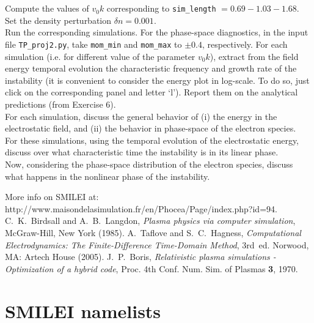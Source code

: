 \documentclass[10pt]{article}
\begin{document}
$ $\\
\\
  Compute the values of $v_0 k$ corresponding to \texttt{sim\_length} $= 0.69 - 1.03 - 1.68$. Set the density perturbation $\delta n = 0.001$. \\
 Run the corresponding simulations. For the phase-space diagnostics, in the input file \texttt{TP\_proj2.py}, take \texttt{mom\_min} and \texttt{mom\_max} to $\pm 0.4$, respectively. For each simulation (i.e. for different value of the parameter $v_0 k$), extract from the field energy temporal evolution the characteristic frequency and growth rate of the instability (it is convenient to consider the energy plot in log-scale. To do so, just click on the corresponding panel and letter `l'). Report them on the analytical predictions (from Exercise 6).\\
 For each simulation, discuss the general behavior of (i) the energy in the electrostatic field, and (ii) the behavior in phase-space of the electron species. \\
 For these simulations, using the temporal evolution of the electrostatic energy, discuss over what characteristic time the instability is in its linear phase.\\
 Now, considering the phase-space distribution of the electron species, discuss what happens in the nonlinear phase of the instability.




\begin{thebibliography}{2}

 More info on SMILEI at: http://www.maisondelasimulation.fr/en/Phocea/Page/index.php?id=94.
 C.~K.~Birdsall and A.~B.~Langdon, {\it Plasma physics via computer simulation}, McGraw-Hill, New York (1985).
 A.~Taflove and S.~C.~Hagness, {\it Computational Electrodynamics: The Finite-Difference Time-Domain Method}, 3rd~ed. Norwood, MA: Artech House (2005).
 J.~P.~Boris, {\it Relativistic plasma simulations - Optimization of a hybrid code}, Proc. 4th Conf. Num. Sim. of Plasmas {\bf 3}, 1970.


\end{thebibliography}

\vfill\eject

\section*{SMILEI namelists}



\clearpage

\end{document}

